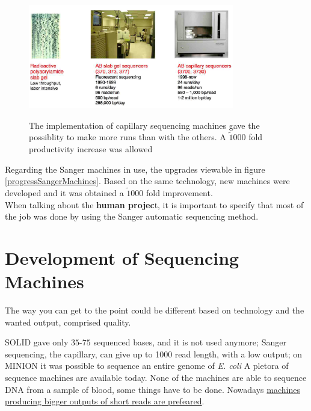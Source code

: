 \begin{figure}[h]
\caption{The implementation of capillary sequencing machines gave the possiblity to make more runs than with the others. A $\tilde 1000$ fold productivity increase was allowed}
\centering
\includegraphics[width=0.8\textwidth]{progressSangerMachines}
\label{}
\end{figure}

Regarding the Sanger machines in use, the upgrades viewable in figure \ref{progressSangerMachines}. Based on the same technology, new machines were developed and it was obtained a $\tilde 1000$ fold improvement.
\\
When talking about the \textbf{human projec}t, it is important to specify that most of the job was done by using the Sanger automatic sequencing method. 


\section{Development of Sequencing Machines}
The way you can get to the point could be different based on technology and the wanted output, comprised quality. 

SOLID gave only $35$-$75$ sequenced bases, and it is not used anymore; Sanger sequencing, the capillary, can give up to 1000 read length, with a low output; on MINION it was possible to sequence an entire genome of \textit{E. coli}
A pletora of sequence machines are available today. None of the machines are able to sequence DNA from a sample of blood, some things have to be done. Nowadays \underline{machines producing bigger outputs of short reads are prefeared}.

